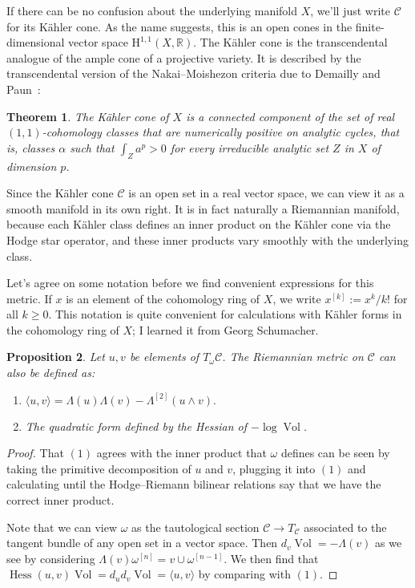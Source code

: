\documentclass[11pt,a4paper]{amsart}
\newtheorem{theo}{Theorem}[section]
\newtheorem{prop}[theo]{Proposition}
\theoremstyle{definition}
\theoremstyle{remark}
\newcommand{\RR}{\mathbb{R}}
\newcommand{\Vol}{\mathop{\mathrm{Vol}}}
\def\coho#1{\mathrm{H}^{#1}}
\def\kf{\omega}
\def\Lef{\Lambda}
\def\ton{u}
\def\ttw{v}
\def\^#1{^{[#1]}}
\def\KC{C}
\def\RKC{\mathcal{\KC}}
\begin{document}
If there can be no confusion about the underlying manifold $X$, we'll
just write $\RKC$ for its K\"{a}hler cone.  As the name suggests, this is
an open cones in the finite-dimensional vector space
$\coho{1,1}(X,\RR)$. The K\"{a}hler cone is the transcendental analogue
of the ample cone of a projective variety. It is described by the
transcendental version of the Nakai--Moishezon criteria due to Demailly
and Paun~\cite{DemaillyPaun}:


\begin{theo}
The K\"{a}hler cone of $X$ is a connected component of the set of real
$(1,1)$-cohomology classes that are numerically positive on analytic
cycles, that is, classes $\alpha$ such that $\int_{Z} a^p > 0$ for every
irreducible analytic set $Z$ in $X$ of dimension $p$.
\end{theo}



Since the K\"{a}hler cone $\RKC$ is an open set in a real vector space,
we can view it as a smooth manifold in its own right. It is in fact
naturally a Riemannian manifold, because each K\"{a}hler class defines an
inner product on the K\"{a}hler cone via the Hodge star operator, and these inner
products vary smoothly with the underlying class.


Let's agree on some notation before we find convenient expressions for
this metric. If $x$ is an element of the cohomology ring of $X$, we
write $x\^k := x^k/k!$ for all $k \geq 0$. This notation is
quite convenient for calculations with K\"{a}hler forms in the cohomology
ring of $X$; I learned it from Georg Schumacher.


\begin{prop}
Let $\ton,\ttw$ be elements of $T_{\kf}\RKC$. The Riemannian metric on $\RKC$
can also be defined as:
\begin{enumerate}
    \item
\hfil
$
\langle \ton, \ttw \rangle
= \Lef(\ton)\Lef(\ttw)
- \Lef\^2(\ton\wedge\ttw).
$
\hfil

    \item
The quadratic form defined by the Hessian of $-\log\Vol$.
\end{enumerate}
\end{prop}


\begin{proof}
That $(1)$ agrees with the inner product that $\kf$ defines can be seen by
taking the primitive decomposition of $\ton$ and $\ttw$, plugging it into $(1)$
and calculating until the Hodge--Riemann bilinear relations say that we have the
correct inner product.

Note that we can view $\kf$ as the tautological section $\RKC \to T_{\RKC}$
associated to the tangent bundle of any open set in a vector space.
Then $d_{\ttw} \Vol = -\Lef(\ttw)$ as we see by considering
$\Lef(\ttw) \kf\^n = \ttw \cup \kf\^{n-1}$. We then find that
$\operatorname{Hess}(\ton,\ttw) \Vol 
= d_{\ton} d_{\ttw}\Vol = \langle \ton, \ttw \rangle$ by comparing with
$(1)$.
\end{proof}
\end{document}
